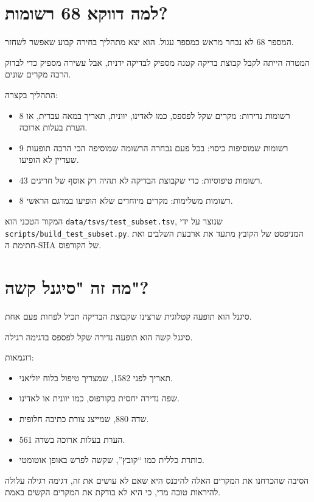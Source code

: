 \documentclass[12pt,a4paper]{article}
\begin{document}
\section{\texthebrew{למה דווקא 68 רשומות?}}
\begin{hebrew}
המספר 68 לא נבחר מראש כמספר עגול. הוא יצא מתהליך בחירה קבוע שאפשר לשחזר.
\par
המטרה הייתה לקבל קבוצת בדיקה קטנה מספיק לבדיקה ידנית, אבל עשירה מספיק כדי לבדוק הרבה מקרים שונים.
\par
התהליך בקצרה:
\begin{itemize}
  \item 8 רשומות נדירות: מקרים שקל לפספס, כמו לאדינו, יוונית, תאריך במאה עברית, או הערת בעלות ארוכה.
  \item 9 רשומות שמוסיפות כיסוי: בכל פעם נבחרה הרשומה שמוסיפה הכי הרבה תופעות שעדיין לא הופיעו.
  \item 43 רשומות טיפוסיות: כדי שקבוצת הבדיקה לא תהיה רק אוסף של חריגים.
  \item 8 רשומות משלימות: מקרים מיוחדים שלא הופיעו במדגם הראשי.
\end{itemize}
\par
המקור הטכני הוא \texttt{data/tsvs/test\_subset.tsv}, שנוצר על ידי \texttt{scripts/build\_test\_subset.py}. המניפסט של הקובץ מתעד את ארבעת השלבים ואת חתימת ה-SHA של הקורפוס.
\end{hebrew}

\section{\texthebrew{מה זה "סיגנל קשה"?}}
\begin{hebrew}
סיגנל הוא תופעה קטלוגית שרצינו שקבוצת הבדיקה תכיל לפחות פעם אחת.
\par
סיגנל קשה הוא תופעה נדירה שקל לפספס בדגימה רגילה.
\par
דוגמאות:
\begin{itemize}
  \item תאריך לפני 1582, שמצריך טיפול בלוח יוליאני.
  \item שפה נדירה יחסית בקורפוס, כמו יוונית או לאדינו.
  \item שדה 880, שמייצג צורת כתיבה חלופית.
  \item הערת בעלות ארוכה בשדה 561.
  \item כותרת כללית כמו ``קובץ'', שקשה לפרש באופן אוטומטי.
\end{itemize}
\par
הסיבה שהכרחנו את המקרים האלה להיכנס היא שאם לא עושים את זה, דגימה רגילה עלולה להיראות טובה מדי, כי היא לא בודקת את המקרים הקשים באמת.
\end{hebrew}
\end{document}
